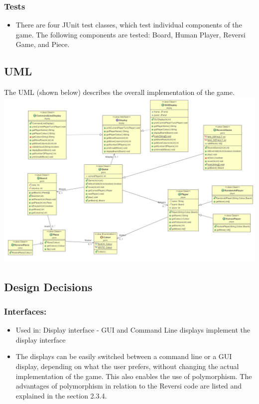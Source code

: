 \documentclass[english]{article}
\begin{document}
\subsubsection{Tests}
\begin{itemize}
\item There are four JUnit test classes, which test individual components
of the game. The following components are tested: Board, Human Player,
Reversi Game, and Piece.
\end{itemize}

\subsection{UML}

The UML (shown below) describes the overall implementation of the
game. \\
\includegraphics[width=7in]{UML}

\subsection{Design Decisions}
\subsubsection{Interfaces:}
\begin{itemize}
\item Used in: Display interface - GUI and Command Line displays implement
the display interface
\item The displays can be easily switched between a command line or a GUI
display, depending on what the user prefers, without changing the
actual implementation of the game. This also enables the use of polymorphism.
The advantages of polymorphism in relation to the Reversi code are
listed and explained in the section 2.3.4. 
\end{itemize}
\end{document}
